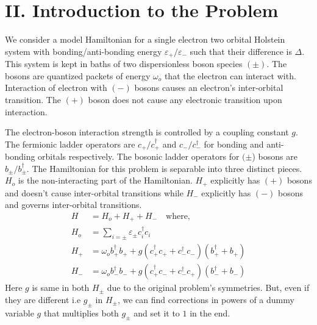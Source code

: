 \documentclass[%
 reprint,
 amsmath,amssymb,
 aps,prl,
floatfix
]{revtex4-2}
\begin{document}
\section{II. Introduction to the Problem}
 We consider a model Hamiltonian for a single electron two orbital Holstein system with bonding/anti-bonding energy $\varepsilon_+/\varepsilon_-$ such that their difference is $\Delta$. This system is kept in baths of two dispersionless boson species $(\pm)$. The bosons are quantized packets of energy $\omega_o$ that the electron can interact with. Interaction of electron with $(-)$ bosons causes an electron's inter-orbital transition. The $(+)$ boson does not cause any electronic transition upon interaction. 
 
 The electron-boson interaction strength is controlled by a coupling constant $g$. The fermionic ladder operators are $c_+/c_+^\dagger$ and $c_-/c_-^\dagger$ for bonding and anti-bonding orbitals respectively. The bosonic ladder operators for $(\pm$) bosons are $b_\pm /b_\pm^\dagger$. The Hamiltonian for this problem is separable into three distinct pieces. $H_o$ is the non-interacting part of the Hamiltonian. $H_+$ explicitly has $(+)$ bosons and doesn't cause inter-orbital transitions while $H_-$ explicitly has $(-)$ bosons and governs inter-orbital transitions.
\begin{equation}
\begin{aligned}
H\, &= H_o + H_+ + H_- \quad\text{where,} \\
H_o &= \sum_{i=\pm} \varepsilon_\pm c_i^\dagger c_i  \\
H_+ &=  \omega_o b_+^\dagger b_+ +  g(c_+^\dagger c_+ + c_-^\dagger c_-)(b_+^\dagger + b_+) \\
H_- &=  \omega_o b_-^\dagger b_- +g(c_+^\dagger c_- + c_-^\dagger c_+)(b_-^\dagger + b_-)
\end{aligned}
\label {Holstein}
\end{equation}
 Here $g$ is same in both $H_\pm$ due to the original problem's symmetries. But, even if they are different i.e $g_\pm$ in $H_\pm$, we can find corrections in powers of a dummy variable $g$ that multiplies both $g_\pm$ and set it to $1$ in the end.
\end{document}

